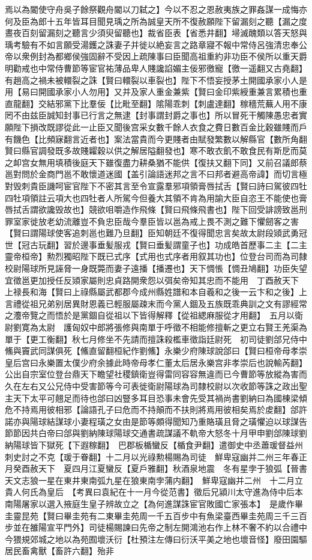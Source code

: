 焉以為閽使守舟吳子餘祭觀舟閽以刀弑之】今以不忍之恩赦夷族之罪姦謀一成悔亦何及臣為郎十五年皆耳目聞見瑀之所為誠皇天所不復赦願陛下留漏刻之聽【漏之度晝夜百刻留漏刻之聽言少須臾留聽也】裁省臣表【省悉井翻】埽滅醜類以答天怒與瑀考驗有不如言願受湯鑊之誅妻子并徙以絶妄言之路章寢不報中常侍呂強清忠奉公帝以衆例封為都鄉侯強固辭不受因上疏陳事曰臣聞高祖重約非功臣不侯所以重天爵明勸戒也中常侍曹節等宦官祐薄品卑人賤讒諂媚主佞邪徼寵【徼一遥翻又古堯翻】有趙高之禍未被轘裂之誅【賢曰轘裂以車裂也】陛下不悟妄授茅土開國承家小人是用【易曰開國承家小人勿用】又并及家人重金兼紫【賢曰金印紫綬重兼言累積也重直龍翻】交結邪黨下比羣佞【比毗至翻】隂陽乖刺【刺盧達翻】稼穡荒蕪人用不康罔不由兹臣誠知封事已行言之無逮【封事謂封爵之事也】所以冒死干觸陳愚忠者實願陛下損改既謬從此一止臣又聞後宫采女數千餘人衣食之費日數百金比穀雖賤而戶有饑色【比頻寐翻言近者也】案法當貴而今更賤者由賦發繁數以解縣官【數所角翻賢曰縣官調發既多故賤糶穀以供之解居隘翻發也】寒不敢衣飢不敢食民有斯戹而莫之卹宫女無用填積後庭天下雖復盡力耕桑猶不能供【復扶又翻下同】又前召議郎蔡邕對問於金商門邕不敢懷道迷國【盖引論語迷邦之言不曰邦者避高帝諱】而切言極對毁刺貴臣譏呵宦官陛下不密其言至令宣露羣邪項領膏唇拭舌【賢曰詩曰駕彼四牡四牡項領註云項大也四牡者人所駕今但養大其領不肯為用諭大臣自恣王不能使也膏唇拭舌謂欲讒毁故也】競欲咀嚼造作飛條【賢曰飛條飛書也】陛下回受誹謗致邕刑罪室家徙放老幼流離豈不負忠臣哉今羣臣皆以邕為戒上畏不測之難下懼劒客之害【賢曰謂陽球使客追刺邕也難乃旦翻】臣知朝廷不復得聞忠言矣故太尉段熲武勇冠世【冠古玩翻】習於邊事垂髪服戎【賢曰垂髪謂童子也】功成皓首歷事二主【二主靈帝桓帝】勲烈獨昭陛下既已式序【式用也式序者用叙其功也】位登台司而為司隸校尉陽球所見誣脅一身既斃而妻子遠播【播遷也】天下惆悵【惆丑鳩翻】功臣失望宜徵邕更加授任反熲家屬則忠貞路開衆怨以弭矣帝知其忠而不能用　丁酉赦天下　上禄長和海【賢曰上祿縣屬武都郡今成州縣姓譜和本自羲和之後一云卞和之後】上言禮從祖兄弟别居異財恩義已輕服屬疎末而今黨人錮及五族既乖典訓之文有謬經常之灋帝覽之而悟於是黨錮自從祖以下皆得解釋【從祖緦麻服從才用翻】　五月以衛尉劉寛為太尉　護匈奴中郎將張修與南單于呼徵不相能修擅斬之更立右賢王羌渠為單于【更工衡翻】秋七月修坐不先請而擅誅殺檻車徵詣廷尉死　初司徒劉郃兄侍中鯈與竇武同謀俱死【鯈直留翻桓紀作劉鯈】永樂少府陳球說郃曰【賢曰桓帝母孝崇皇后宫曰永樂置太僕少府余據此時帝母孝仁董太后居永樂宫非孝崇后也說輸芮翻】公出自宗室位登台鼎天下瞻望社稷鎮衛豈得雷同容容無違而已今曹節等放縱為害而久在左右又公兄侍中受害節等今可表徙衛尉陽球為司隸校尉以次收節等誅之政出聖主天下太平可翹足而待也郃曰凶豎多耳目恐事未會先受其禍尚書劉納曰為國棟梁傾危不持焉用彼相邪【論語孔子曰危而不持顛而不扶則將焉用彼相矣焉於䖍翻】郃許諾亦與陽球結謀球小妻程璜之女由是節等頗得聞知乃重賂璜且脅之璜懼迫以球謀告節節因共白帝曰郃與劉納陳球陽球交通書疏謀議不軌帝大怒冬十月甲申劉郃陳球劉納陽球皆下獄死【下遐稼翻】　巴郡板楯蠻反【楯食尹翻】遣御史中丞蕭瑗督益州刺史討之不克【瑗于眷翻】十二月以光祿勲楊賜為司徒　鮮卑寇幽并二州三年春正月癸酉赦天下　夏四月江夏蠻反【夏戶雅翻】秋酒泉地震　冬有星孛于狼弧【晉書天文志狼一星在東井東南弧九星在狼東南孛蒲内翻】　鮮卑寇幽并二州　十二月立貴人何氏為皇后　【考異曰袁紀在十一月今從范書】徵后兄潁川太守進為侍中后本南陽屠家以選入掖庭生皇子辨故立之【為何進謀誅宦官敗國亡家張本】　是歲作畢圭靈昆苑【賢曰畢圭苑有二東畢圭苑周一千五百步中有魚梁臺西畢圭苑周三千三百步並在雒陽宣平門外】司徒楊賜諫曰先帝之制左開鴻池右作上林不奢不約以合禮中今猥規郊城之地以為苑囿壞沃衍【杜預注左傳曰衍沃平美之地也壞音怪】廢田園驅居民畜禽獸【畜許六翻】殆非
